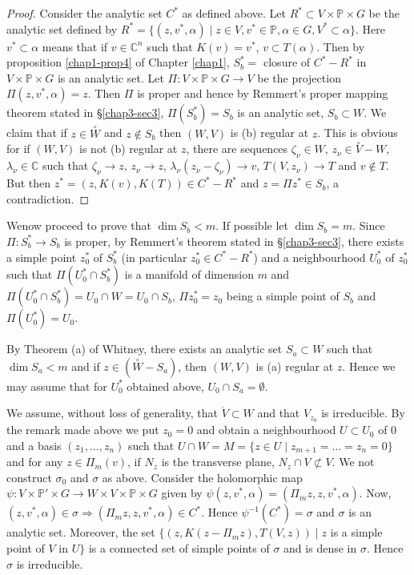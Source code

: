 \begin{proof} %
  Consider the analytic set $C^\ast$ as defined above. Let
  $R^\ast \subset V \times  \mathbb{P} \times G$  be the analytic set
  defined by  
  $R^\ast = \bigg\{ (z,v^\ast,\alpha) \mid z \in V,  v^\ast \in
  \mathbb{P},  \alpha \in G,  V^\ast \subset \alpha \bigg \}$. Here
  $v^\ast \subset \alpha$ means that if $v \in \mathbb{C}^n$
  such that $K(v) = v^\ast$, $v \subset T(\alpha)$. Then by
  proposition \ref{chap1-prop4} of Chapter \ref{chap1}, $S^\ast_b =$
  closure of $C^\ast - 
  R^\ast$ in $V \times  \mathbb{P} \times G$ is an analytic set. Let
  $\Pi: V \times  \mathbb{P} \times G \to V$ be the
  projection $\Pi(z, v^\ast, \alpha) = z$. Then $\Pi$ is proper
  and hence by Remmert's proper mapping theorem stated in \S \ref{chap3-sec3}, 
  $\Pi (S^\ast_b) = S_b$ is an analytic set, $S_b \subset W$. We
  claim that if $z \in \overset{\circ}{W}$ and $z \notin S_b$ then
  $(W,V)$ is (b) regular at $z$. This is obvious for if $(W,V)$ is
  not (b) regular at $z$, there are sequences $\zeta_\nu \in W$,
  $z_\nu \in \overset{\circ}{V} - W$, $\lambda_\nu \in \mathbb{C}$
  such that $\zeta_\nu \to z$,  $z_\nu
  \to z$,  $\lambda_\nu (z_\nu - \zeta_\nu) \to v$,
  $T(V,z_\nu)  \to  T$ and $v \notin T$. But then $z^{*} =
  (z,K(v),K(T)) \in C^\ast - R^\ast$ and $z = \Pi z^\ast \in
  S_b$, a contradiction. 
\end{proof}

We\pageoriginale now proceed to prove that $\dim S_{b}<m$. If possible
let $\dim S_{b}=m$. Since $\Pi:S^{\ast}_{b}\to S_{b}$ is proper, by
Remmert's theorem stated in \S \ref{chap3-sec3}, there exists a simple
point $z^{*}_{0}$ of $S^{\ast}_{b}$ (in particular $z^{\ast}_{0}\in
C^{*}-R^{*}$) and a neighbourhood $U^{*}_{0}$ of $z^{\ast}_{0}$ such
that $\Pi(U^{\ast}_{0}\cap S^{*}_{b})$ is a manifold of dimension $m$
and $\Pi(U^{*}_{0}\cap S^{*}_{b})=U_{0}\cap W=U_{0}\cap S_{b}$, $\Pi
z^{*}_{0}=z_{0}$ being a simple point of $S_{b}$ and
$\Pi(U^{*}_{0})=U_{0}$. 

By Theorem (a) of Whitney, there exists an analytic set $S_{a}\subset
W$ such that $\dim S_{a}<m$ and if $z\in (\overset{\circ}{W}-S_{a})$,
then $(W,V)$ is (a) regular at $z$. Hence we may assume that for
$U^{*}_{0}$ obtained above, $U_{0}\cap S_{a}=\emptyset$.

We assume, without loss of generality, that $\dot{V}\subset W$ and
that $V_{z_{0}}$ is irreducible. By the remark made above we put
$z_{0}=0$ and obtain a neighbourhood $U\subset U_{0}$ of $0$ and a
basis $(z_{1},\ldots,z_{n})$ such that $U\cap W=M=\{z\in U\mid
z_{m+1}=\ldots=z_{n}=0\}$ and for any $z\in \Pi_{m}(v)$, if $N_{z}$ is
the transverse plane, $N_{z}\cap V\not\subset V$. We not construct
$\sigma_{0}$ and $\sigma$ as above. Consider the holomorphic map
$\psi:V\times \mathbb{P}'\times G\to W\times V\times \mathbb{P}\times
G$ given by
$\psi(z,v^{\ast},\alpha)=(\Pi_{m}z,z,v^{\ast},\alpha)$. Now,
$(z,v^{\ast},\alpha)\in
\sigma\Rightarrow(\Pi_{m}z,z,v^{\ast},\alpha)\in C^{\ast}$. Hence
$\psi^{-1}(C^{*})=\sigma$ and $\sigma$ is an analytic set. Moreover,
the set $\{(z,K(z-\Pi_{m}z),T(V,z))\mid z$ is a simple point of $V$ in
$U\}$ is a connected set of simple points of $\sigma$ and is dense in
$\sigma$. Hence $\sigma$ is irreducible.

